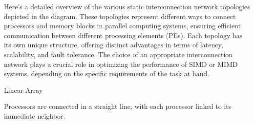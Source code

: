 \documentclass[a4paper, 10pt]{book}
\begin{document}
                    Here's a detailed overview of the various static interconnection network topologies depicted in the diagram. These topologies represent different ways to connect processors and memory blocks in parallel computing systems, ensuring efficient communication between different processing elements (PEs). Each topology has its own unique structure, offering distinct advantages in terms of latency, scalability, and fault tolerance. The choice of an appropriate interconnection network plays a crucial role in optimizing the performance of SIMD or MIMD systems, depending on the specific requirements of the task at hand.

                    \noindent
                    \begin{minipage}{0.4925\linewidth}
                        
                        \vspace{-51pt}

                        \begin{tcolorbox}[colframe=black!50, colback=white, size=small]

                            {\bold Linear Array}
                            
                            Processors are connected in a straight line, with each processor linked to its immediate neighbor.

                            \begin{center}
                            \end{center}

                        \end{tcolorbox} %

                        \begin{tcolorbox}[colframe=black!50, colback=white, size=small]
                            

\end{tcolorbox}
\end{minipage}
\end{document}
